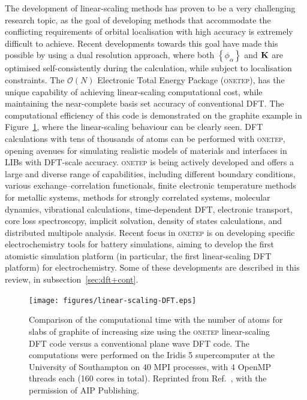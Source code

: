 \documentclass[../main.tex]{subfiles}
\begin{document}
The development of linear-scaling methods has proven to be a very challenging research topic, as the goal of developing methods that accommodate the conflicting requirements of orbital localisation with high accuracy is extremely difficult to achieve. Recent developments towards this goal have made this possible by using a dual resolution approach, where both $\left\{\phi_\alpha\right\}$ and $\bf K$ are optimised self-consistently during the calculation, while subject to localisation constraints. \cite{ONETEP2005,Gillan2007,Mohr2015}
The $\mathcal{O}(N)$ Electronic Total Energy Package (\textsc{onetep}),\cite{ONETEP2020} has the unique capability of achieving linear-scaling computational cost, while maintaining the near-complete basis set accuracy of conventional DFT. The computational efficiency of this code is demonstrated on the graphite example in Figure~\ref{fig:ls}, where the linear-scaling behaviour can be clearly seen. DFT calculations with tens of thousands of atoms can be performed with \textsc{onetep}, opening avenues for simulating realistic models of materials and interfaces in LIBs with DFT-scale accuracy. \textsc{onetep} is being actively developed and offers a large and diverse range of capabilities, including different boundary conditions, various exchange–correlation functionals, finite electronic temperature methods for metallic systems, methods for strongly correlated systems, molecular dynamics, vibrational calculations, time-dependent DFT, electronic transport, core loss spectroscopy, implicit solvation, density of states calculations, and distributed multipole analysis. \cite{ONETEP2020} Recent focus in \textsc{onetep} is on developing specific electrochemistry tools for battery simulations, aiming to develop the first atomistic simulation platform (in particular, the first linear-scaling DFT platform) for electrochemistry. Some of these developments are described in this review, in subsection~\ref{sec:dft+cont}.

\begin{figure}
    \centering
    \texttt{[image: figures/linear-scaling-DFT.eps]}
    \caption{Comparison of the computational time with the number of atoms for slabs of graphite of increasing size using the \textsc{onetep} linear-scaling DFT code versus a conventional plane wave DFT code. The computations were performed on the Iridis 5 supercomputer at the University of Southampton on $40$ MPI processes, with 4 OpenMP threads each (160 cores in total). Reprinted from Ref.~, with the permission of AIP Publishing.}
    \label{fig:ls}
\end{figure}
\end{document}
